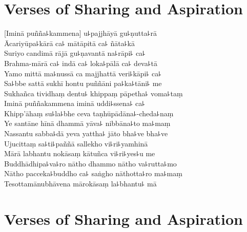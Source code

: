 
\chapter*[Sharing and Aspiration]{Verses of Sharing and Aspiration}%

\delegateSetUseNext

\begin{leader}
\end{leader}


[Iminā puñña꜕kammena] u꜕pajjhāyā gu꜕ṇutta꜕rā\\
Ācariyūpa꜕kārā ca꜕ mātāpitā ca꜕ ñāta꜕kā\\
Suriyo candimā rājā gu꜕ṇavantā na꜕rāpi꜕ ca꜕\\
Brahma-mārā ca꜕ indā ca꜕ loka꜕pālā ca꜕ deva꜕tā\\
Yamo mittā ma꜕nussā ca majjhattā veri꜕kāpi꜕ ca꜕\\
Sa꜕bbe sattā sukhī hontu puññāni pa꜕ka꜕tāni꜕ me\\
Sukhañca tividhaṃ dentu꜕ khippaṃ pāpetha꜕ voma꜕taṃ\\
Iminā puññakammena iminā uddi꜕ssena꜕ ca꜕\\
Khipp'āhaṃ su꜕la꜕bhe ceva taṇhūpādāna꜕-cheda꜕naṃ\\
Ye santāne hīnā dhammā yāva꜕ nibbāna꜕to ma꜕maṃ\\
Nassantu sabba꜕dā yeva yattha꜕ jāto bha꜕ve bha꜕ve\\
Ujucittaṃ sa꜕ti꜕paññā sallekho vi꜕ri꜕yamhinā\\
Mārā labhantu nokāsaṃ kātuñca vi꜕ri꜕yes꜕u me\\
Buddhādhipa꜕va꜕ro nātho dhammo nātho va꜕rutta꜕mo\\
Nātho pacceka꜕buddho ca꜕ saṅgho nāthotta꜕ro ma꜕maṃ\\
Tesottamānubhāvena mārokāsaṃ la꜕bhantu꜕ mā

\chapter[Sharing and Aspiration]{Verses of Sharing and Aspiration}%

\begin{leader}
\end{leader}


